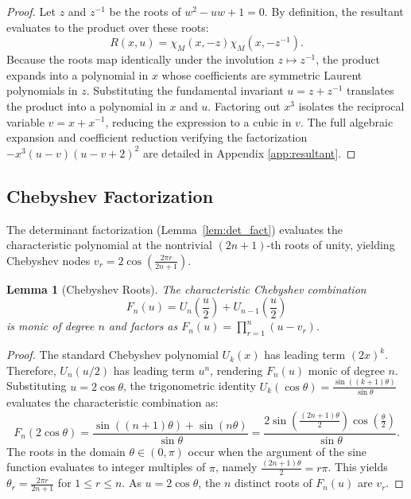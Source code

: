\documentclass[11pt]{article}
\newtheorem{lemma}[theorem]{Lemma}
\begin{document}
\begin{proof}
Let $z$ and $z^{-1}$ be the roots of $w^2 - uw + 1 = 0$. By definition, the resultant evaluates to the product over these roots:
\begin{equation*}
R(x, u) = \chi_M(x, -z) \chi_M(x, -z^{-1}).
\end{equation*}
Because the roots map identically under the involution $z \mapsto z^{-1}$, the product expands into a polynomial in $x$ whose coefficients are symmetric Laurent polynomials in $z$. Substituting the fundamental invariant $u = z+z^{-1}$ translates the product into a polynomial in $x$ and $u$. Factoring out $x^3$ isolates the reciprocal variable $v = x+x^{-1}$, reducing the expression to a cubic in $v$. The full algebraic expansion and coefficient reduction verifying the factorization $-x^3(u-v)(u-v+2)^2$ are detailed in Appendix \ref{app:resultant}.
\end{proof}

\subsection{Chebyshev Factorization}

The determinant factorization (Lemma~\ref{lem:det_fact}) evaluates the characteristic polynomial at the nontrivial $(2n+1)$-th roots of unity, yielding Chebyshev nodes $v_r = 2\cos\left(\frac{2\pi r}{2n+1}\right)$.

\begin{lemma}[Chebyshev Roots]\label{lem:cheb_roots}
The characteristic Chebyshev combination 
\begin{equation}
F_n(u) = U_n\left(\frac{u}{2}\right) + U_{n-1}\left(\frac{u}{2}\right)
\end{equation}
is monic of degree $n$ and factors as $F_n(u) = \prod_{r=1}^n (u - v_r)$.
\end{lemma}

\begin{proof}
The standard Chebyshev polynomial $U_k(x)$ has leading term $(2x)^k$. Therefore, $U_n(u/2)$ has leading term $u^n$, rendering $F_n(u)$ monic of degree $n$. Substituting $u = 2\cos\theta$, the trigonometric identity $U_k(\cos\theta) = \frac{\sin((k+1)\theta)}{\sin\theta}$ \cite{Mason2002} evaluates the characteristic combination as:
\begin{equation*}
F_n(2\cos\theta) = \frac{\sin((n+1)\theta) + \sin(n\theta)}{\sin\theta} = \frac{2\sin\left(\frac{(2n+1)\theta}{2}\right)\cos\left(\frac{\theta}{2}\right)}{\sin\theta}.
\end{equation*}
The roots in the domain $\theta \in (0, \pi)$ occur when the argument of the sine function evaluates to integer multiples of $\pi$, namely $\frac{(2n+1)\theta}{2} = r\pi$. This yields $\theta_r = \frac{2\pi r}{2n+1}$ for $1 \le r \le n$. As $u=2\cos\theta$, the $n$ distinct roots of $F_n(u)$ are $v_r$.
\end{proof}
\end{document}

